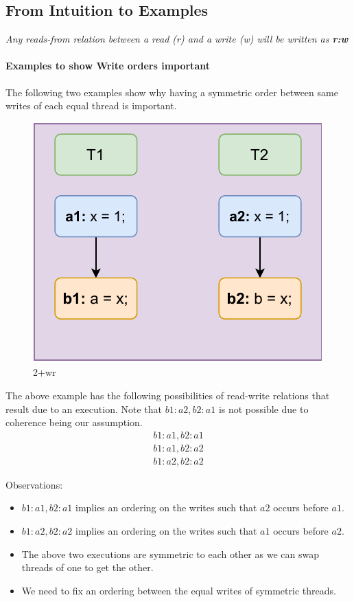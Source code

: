 \subsection{From Intuition to Examples}

    
    \emph{Any reads-from relation between a read (r) and a write (w) will be written as \textbf{r:w}} 


    \paragraph{Examples to show Write orders important}

        The following two examples show why having a symmetric order between same writes of each equal thread is important. 
        \begin{figure}[H]
            \centering 
            \includegraphics[scale=0.7]{Example1(2+wr).pdf}
            \caption{2+wr}
        \end{figure}

        The above example has the following possibilities of read-write relations that result due to an execution. Note that $b1:a2 , b2:a1$ is not possible due to coherence being our assumption. 
        \begin{align*}
            b1:a1 , b2:a1 \\ 
            b1:a1 , b2:a2 \\
            b1:a2 , b2:a2
        \end{align*}

        Observations:
        \begin{itemize}
            \item $b1:a1, b2:a1$ implies an ordering on the writes such that $a2$ occurs before $a1$.
            \item $b1:a2, b2:a2$ implies an ordering on the writes such that $a1$ occurs before $a2$.
            \item The above two executions are symmetric to each other as we can swap threads of one to get the other. 
            \item We need to fix an ordering between the equal writes of symmetric threads. 
        \end{itemize}
    
